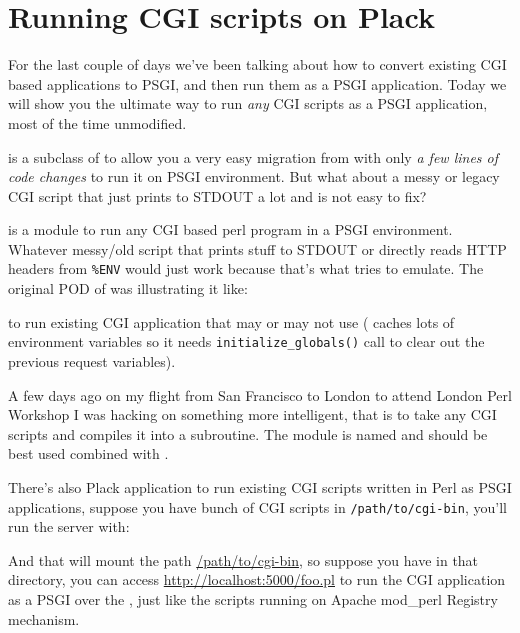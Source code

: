 \chapter{Running CGI scripts on Plack}\label{day-9-running-cgi-scripts-on-plack}

For the last couple of days we've been talking about how to convert
existing CGI based applications to PSGI, and then run them as a PSGI
application. Today we will show you the ultimate way to run \emph{any}
CGI scripts as a PSGI application, most of the time unmodified.

\href{http://search.cpan.org/perldoc?CGI::PSGI}{} is a subclass
of  to allow you a very easy migration from  with only
\emph{a few lines of code changes} to run it on PSGI environment. But
what about a messy or legacy CGI script that just prints to STDOUT a lot
and is not easy to fix?

\href{http://search.cpan.org/perldoc?CGI::Emulate::PSGI}{}
is a module to run any CGI based perl program in a PSGI environment.
Whatever messy/old script that prints stuff to STDOUT or directly reads
HTTP headers from \lstinline!%ENV! would just work because that's what
 tries to emulate. The original POD of
 was illustrating it like:

%
to run existing CGI application that may or may not use  (
caches lots of environment variables so it needs
\lstinline!initialize_globals()! call to clear out the previous request
variables).

A few days ago on my flight from San Francisco to London to attend
London Perl Workshop I was hacking on something more intelligent, that
is to take any CGI scripts and compiles it into a subroutine. The module
is named
\href{http://search.cpan.org/perldoc?CGI::Compile}{} and
should be best used combined with .


There's also
\href{http://search.cpan.org/perldoc?Plack::App::CGIBin}{}
Plack application to run existing CGI scripts written in Perl as PSGI
applications, suppose you have bunch of CGI scripts in
\lstinline!/path/to/cgi-bin!, you'll run the server with:


And that will mount the path \url{/path/to/cgi-bin}, so suppose
you have  in that directory, you can access
\url{http://localhost:5000/foo.pl} to run the CGI application as a PSGI over
the , just like the scripts running on Apache mod\_perl Registry
mechanism.

